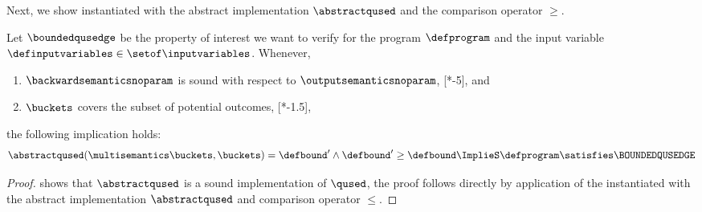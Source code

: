 Next, we show  instantiated with the abstract implementation $\abstractqused$ and the comparison operator $\ge$.

\begin{theorem} 
  Let $\boundedqusedge$ be the property of interest we want to verify for the program $\defprogram$ and the input variable $\definputvariables\in\setof\inputvariables$.
  Whenever,
  \begin{enumerate}[label=(\roman*)]
    \item $\backwardsemanticsnoparam$ is sound with respect to $\outputsemanticsnoparam$, \cf{} [*-5], and
    \item $\buckets$ covers the subset of potential outcomes, \cf{} [*-1.5],
\end{enumerate}
  the following implication holds:
  \begin{align*}
    \abstractqused(\multisemantics\buckets, \buckets) = \defbound' \land \defbound' \ge \defbound \ImplieS \defprogram \satisfies \BOUNDEDQUSEDGE
  \end{align*}
\end{theorem}
\begin{proof}
   shows that $\abstractqused$ is a sound implementation of $\qused$, the proof follows directly by application of the  instantiated with the abstract implementation $\abstractqused$ and comparison operator $\le$.
\end{proof}

